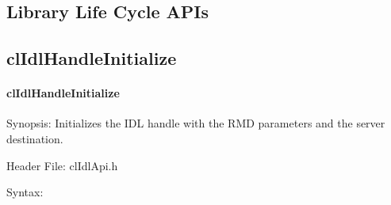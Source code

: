 \begin{flushleft}
\newpage

\section{Library Life Cycle APIs}
\subsection{clIdlHandleInitialize}
\hypertarget{pageidl201}{}\paragraph{cl\-Idl\-Handle\-Initialize}\label{pageidl201}
\begin{Desc}
\item[Synopsis:]Initializes the IDL handle with the RMD parameters and the server destination. \end{Desc}
\begin{Desc}
\item[Header File:]clIdlApi.h\end{Desc}
\begin{Desc}
\item[Syntax:]


\end{Desc}
\end{flushleft}
